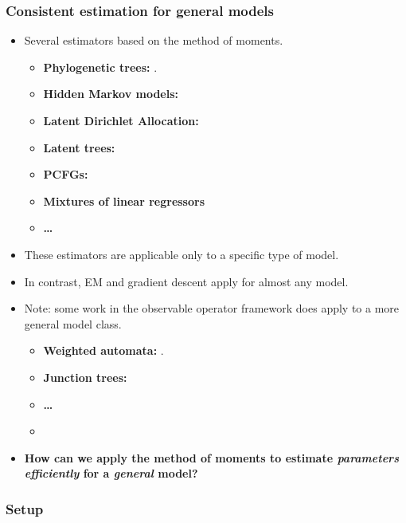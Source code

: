 \documentclass[xcolor={svgnames}]{beamer}
\begin{document}
\begin{frame}
  \frametitle{Consistent estimation for general models}

  \begin{itemize}
    \item<+-> Several estimators based on the method of moments.
      \begin{itemize}
        \item {\bf Phylogenetic trees:} \cite{mossel2005learning}.
        \item {\bf Hidden Markov models:} \cite{hsu09spectral}
        \item {\bf Latent Dirichlet Allocation:} \cite{anandkumar12lda}
        \item {\bf Latent trees:} \cite{anandkumar11tree}
        \item {\bf PCFGs:} \cite{hsu12identifiability}
        \item {\bf Mixtures of linear regressors} \cite{chaganty13regression}
        \item {\bf \ldots}
      \end{itemize}
    \item<+-> These estimators are applicable only to a specific type of model. 
    \item<+-> In contrast, EM and gradient descent apply for almost any model.
    \item<+-> Note: some work in the observable operator framework does apply to a more general model class.
      \begin{itemize}
        \item {\bf Weighted automata:} \cite{balle12automata}.
        \item {\bf Junction trees:} \cite{song2011spectral}
        \item {\bf \ldots}
        \item {}
      \end{itemize}
    \item<+-> {\bf How can we apply the method of moments to estimate {\em parameters efficiently} for a {\em general} model?}
  \end{itemize}
\end{frame}

\begin{frame}
  \frametitle{Setup}
  \end{frame}
\end{document}
